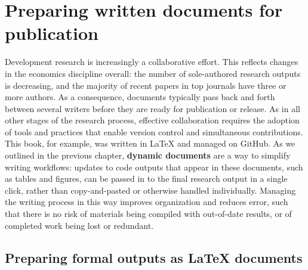 \section{Preparing written documents for publication}

Development research is increasingly a collaborative effort.
This reflects changes in the economics discipline overall:
the number of sole-authored research outputs is decreasing,
and the majority of recent papers in top journals have three or more
authors.
As a consequence, documents typically pass back and forth between several writers
before they are ready for publication or release.
As in all other stages of the research process,
effective collaboration requires the adoption of tools and practices
that enable version control and simultaneous contributions.
This book, for example, was written in {\LaTeX} and managed on GitHub.
As we outlined in the previous chapter,
\textbf{dynamic documents} are a way to simplify writing workflows:
updates to code outputs that appear in these documents, such as tables and figures,
can be passed in to the final research output in a single click,
rather than copy-and-pasted or otherwise handled individually.
Managing the writing process in this way
improves organization and reduces error,
such that there is no risk of materials being compiled
with out-of-date results, or of completed work being lost or redundant.

\subsection{Preparing formal outputs as {\LaTeX} documents}

